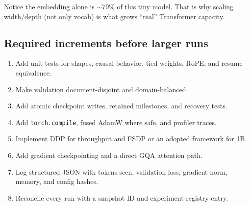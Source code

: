 Notice the embedding alone is \(\sim\)79\% of this tiny model. That is why
scaling width/depth (not only vocab) is what grows ``real'' Transformer
capacity.

\subsection{Required increments before larger runs}

\begin{enumerate}
    \setlength{\itemsep}{0pt}
  \item Add unit tests for shapes, causal behavior, tied weights,
    RoPE, and resume equivalence.
  \item Make validation document-disjoint and domain-balanced.
  \item Add atomic checkpoint writes, retained milestones, and recovery tests.
  \item Add \texttt{torch.compile}, fused AdamW where safe, and profiler traces.
  \item Implement DDP for throughput and FSDP or an adopted framework for 1B.
  \item Add gradient checkpointing and a direct GQA attention path.
  \item Log structured JSON with tokens seen, validation loss,
    gradient norm, memory, and config hashes.
  \item Reconcile every run with a snapshot ID and experiment-registry entry.
\end{enumerate}
